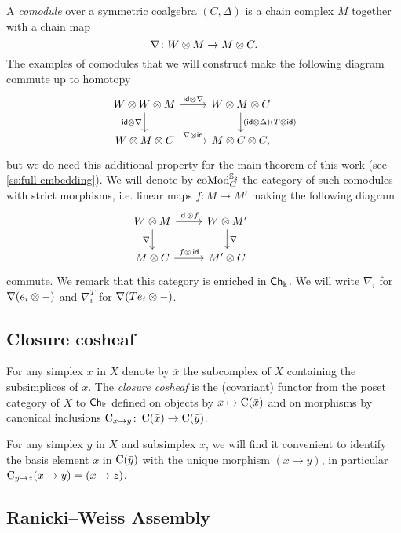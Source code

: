 A \textit{comodule} over a symmetric coalgebra $(C, \Delta)$ is a chain complex $M$ together with a chain map
\[
\nabla \colon W \otimes M \to M \otimes C.
\]
The examples of comodules that we will construct make the following diagram commute up to homotopy
\[
\begin{tikzcd}
	W \ot W \ot M \arrow[r, "\id \ot \nabla"] \arrow[d, "\id \ot \nabla"'] &
	W \ot M \ot C \arrow[d, "(\id \ot \Delta)(T \ot \id)"] \\
	W \ot M \ot C \arrow[r, "\nabla \ot \id"] &
	M \ot C \ot C,
\end{tikzcd}
\]
but we do need this additional property for the main theorem of this work (see \cref{ss:full embedding}).
We will denote by $\operatorname{coMod}_C^{\mathbb{S}_2}$ the category of such comodules with strict morphisms, i.e. linear maps $f \colon M \to M'$ making the following diagram
\[
\begin{tikzcd}
	W \ot M \arrow[d, "\nabla"'] \arrow[r, "\id\, \ot f"] &
	W \ot M' \arrow[d, "\nabla"] & \\
	M \ot C \arrow[r, "f \ot\, \id"] &
	M' \ot C
\end{tikzcd}
\]
commute.
We remark that this category is enriched in $\mathsf{Ch}_\Bbbk$.
We will write $\nabla_i$ for $\nabla(e_i \otimes -)$ and $\nabla_i^T$ for $\nabla(Te_i \otimes -)$.

\subsection{Closure cosheaf}

For any simplex $x$ in $X$ denote by $\bar x$ the subcomplex of $X$ containing the subsimplices of $x$.
The \textit{closure cosheaf} is the (covariant) functor from the poset category of $X$ to $\mathsf{Ch}_\Bbbk$ defined on objects by $x \mapsto \operatorname{C}(\bar x)$ and on morphisms by canonical inclusions $\operatorname{C}_{x \to y} \colon \operatorname{C}(\bar x) \to \operatorname{C}(\bar y)$.

For any simplex $y$ in $X$ and subsimplex $x$, we will find it convenient to identify the basis element $x$ in $\operatorname{C}(\bar y)$ with the unique morphism $(x \to y)$, in particular $\operatorname{C}_{y \to z} (x \to y) = (x \to z)$.

\subsection{Ranicki--Weiss Assembly} \label{ss:assembly}

